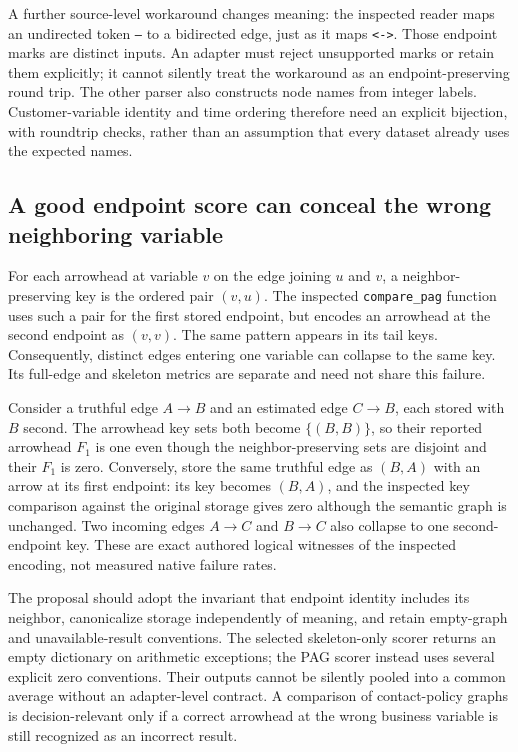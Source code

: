 A further source-level workaround changes meaning: the inspected reader maps
an undirected token \texttt{---} to a bidirected edge, just as it maps
\texttt{<->}. Those endpoint marks are distinct inputs. An adapter must reject
unsupported marks or retain them explicitly; it cannot silently treat the
workaround as an endpoint-preserving round trip. The other parser also
constructs node names from integer labels. Customer-variable identity and
time ordering therefore need an explicit bijection, with roundtrip checks,
rather than an assumption that every dataset already uses the expected names.
\citep{exec28_nested_sources}

\subsection{A good endpoint score can conceal the wrong neighboring variable}
For each arrowhead at variable $v$ on the edge joining $u$ and $v$, a
neighbor-preserving key is the ordered pair $(v,u)$. The inspected
\texttt{compare\_pag} function uses such a pair for the first stored endpoint,
but encodes an arrowhead at the second endpoint as $(v,v)$. The same pattern
appears in its tail keys. Consequently, distinct edges entering one variable
can collapse to the same key. Its full-edge and skeleton metrics are separate
and need not share this failure.~\citep{exec28_nested_sources}

Consider a truthful edge $A\to B$ and an estimated edge $C\to B$, each stored
with $B$ second. The arrowhead key sets both become $\{(B,B)\}$, so their
reported arrowhead $F_1$ is one even though the neighbor-preserving sets are
disjoint and their $F_1$ is zero. Conversely, store the same truthful edge as
$(B,A)$ with an arrow at its first endpoint: its key becomes $(B,A)$, and
the inspected key comparison against the original storage gives zero although
the semantic graph is unchanged. Two incoming edges $A\to C$ and $B\to C$
also collapse to one second-endpoint key. These are exact authored logical
witnesses of the inspected encoding, not measured native failure rates.
\citep{exec28_nested_reference}

The proposal should adopt the invariant that endpoint identity includes its
neighbor, canonicalize storage independently of meaning, and retain empty-graph
and unavailable-result conventions. The selected skeleton-only scorer returns
an empty dictionary on arithmetic exceptions; the PAG scorer instead uses
several explicit zero conventions. Their outputs cannot be silently pooled
into a common average without an adapter-level contract. A comparison of
contact-policy graphs is decision-relevant only if a correct arrowhead at the
wrong business variable is still recognized as an incorrect result.
\citep{exec28_nested_sources}

